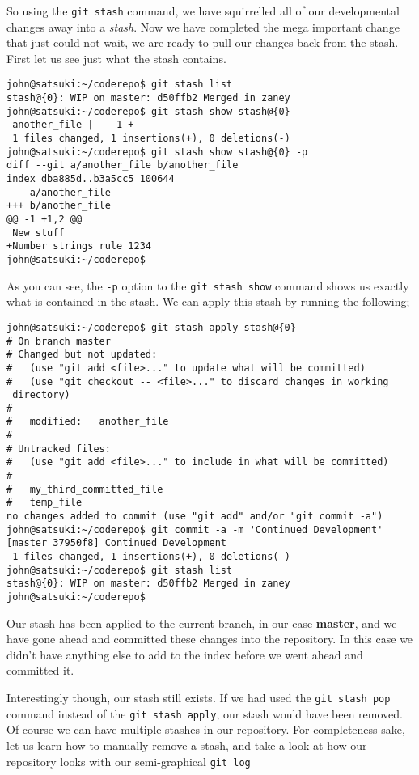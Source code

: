 So using the \texttt{git stash} command, we have squirrelled all of our developmental changes away into a \emph{stash}.  Now we have completed the mega important change that just could not wait, we are ready to pull our changes back from the stash.  First let us see just what the stash contains.

\begin{Verbatim}
john@satsuki:~/coderepo$ git stash list
stash@{0}: WIP on master: d50ffb2 Merged in zaney
john@satsuki:~/coderepo$ git stash show stash@{0}
 another_file |    1 +
 1 files changed, 1 insertions(+), 0 deletions(-)
john@satsuki:~/coderepo$ git stash show stash@{0} -p
diff --git a/another_file b/another_file
index dba885d..b3a5cc5 100644
--- a/another_file
+++ b/another_file
@@ -1 +1,2 @@
 New stuff
+Number strings rule 1234
john@satsuki:~/coderepo$ 
\end{Verbatim}

As you can see, the \texttt{-p} option to the \texttt{git stash show} command shows us exactly what is contained in the stash.  We can apply this stash by running the following;

\begin{Verbatim}
john@satsuki:~/coderepo$ git stash apply stash@{0}
# On branch master
# Changed but not updated:
#   (use "git add <file>..." to update what will be committed)
#   (use "git checkout -- <file>..." to discard changes in working 
 directory)
#
#	modified:   another_file
#
# Untracked files:
#   (use "git add <file>..." to include in what will be committed)
#
#	my_third_committed_file
#	temp_file
no changes added to commit (use "git add" and/or "git commit -a")
john@satsuki:~/coderepo$ git commit -a -m 'Continued Development'
[master 37950f8] Continued Development
 1 files changed, 1 insertions(+), 0 deletions(-)
john@satsuki:~/coderepo$ git stash list
stash@{0}: WIP on master: d50ffb2 Merged in zaney
john@satsuki:~/coderepo$ 
\end{Verbatim}

Our stash has been applied to the current branch, in our case \textbf{master}, and we have gone ahead and committed these changes into the repository.  In this case we didn't have anything else to add to the index before we went ahead and committed it.  

Interestingly though, our stash still exists.  If we had used the \texttt{git stash pop} command instead of the \texttt{git stash apply}, our stash would have been removed.  Of course we can have multiple stashes in our repository.  For completeness sake, let us learn how to manually remove a stash, and take a look at how our repository looks with our semi-graphical \texttt{git log}

